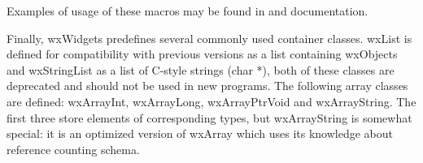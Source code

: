 Examples of usage of these macros may be found in  and 
 documentation.

Finally, wxWidgets predefines several commonly used container classes. wxList
is defined for compatibility with previous versions as a list containing
wxObjects and wxStringList as a list of C-style strings (char *), both of these
classes are deprecated and should not be used in new programs. The following
array classes are defined: wxArrayInt, wxArrayLong, wxArrayPtrVoid and
wxArrayString. The first three store elements of corresponding types, but
wxArrayString is somewhat special: it is an optimized version of wxArray which
uses its knowledge about  reference counting
schema.

